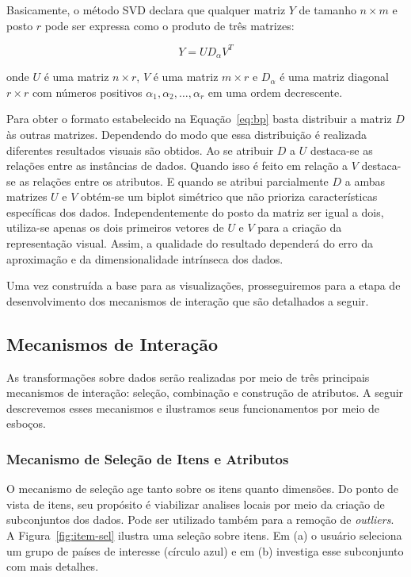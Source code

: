 Basicamente, o método SVD declara que qualquer matriz $Y$
de tamanho $n \times m$ e posto $r$ pode ser expressa como o
produto de três matrizes:

\begin{equation}
    Y = UD_{\alpha}V^T
\end{equation}

onde $U$ é uma matriz $n \times r$, $V$ é uma matriz $m
\times r$ e $D_\alpha$ é uma matriz diagonal $r \times r$
com números positivos $\alpha_1,\alpha_2,\ldots,\alpha_r$ em
uma ordem decrescente. 

Para obter o formato estabelecido na Equação~\ref{eq:bp}
basta distribuir a matriz $D$ às outras matrizes. Dependendo
do modo que essa distribuição é realizada diferentes
resultados visuais são obtidos. Ao se atribuir $D$ a $U$
destaca-se as relações entre as instâncias de dados. Quando
isso é feito em relação a $V$ destaca-se as relações entre
os atributos. E quando se atribui parcialmente $D$ a ambas
matrizes $U$ e $V$ obtém-se um biplot simétrico que não
prioriza características específicas dos dados.
Independentemente do posto da matriz ser igual a dois,
utiliza-se apenas os dois primeiros vetores de $U$ e $V$
para a criação da representação visual. Assim, a qualidade
do resultado dependerá do erro da aproximação e da
dimensionalidade intrínseca dos dados. 

Uma vez construída a base para as visualizações, 
prosseguiremos para a etapa de desenvolvimento dos
mecanismos de interação que são detalhados a seguir.

\subsection{Mecanismos de Interação}

As transformações sobre dados serão realizadas
por meio de três principais mecanismos de interação:
seleção, combinação e construção de atributos. A seguir
descrevemos esses mecanismos e ilustramos seus
funcionamentos por meio de esboços.

\subsubsection{Mecanismo de Seleção de Itens e Atributos}

O mecanismo de seleção age tanto sobre os itens quanto
dimensões. Do ponto de vista de itens, seu propósito é
viabilizar analises locais por meio da criação de
subconjuntos dos dados. Pode ser utilizado também para a
remoção de \emph{outliers}. A Figura~\ref{fig:item-sel}
ilustra uma seleção sobre itens. Em (a) o usuário seleciona
um grupo de países de interesse (círculo azul) e em (b)
investiga esse subconjunto com mais detalhes. 

